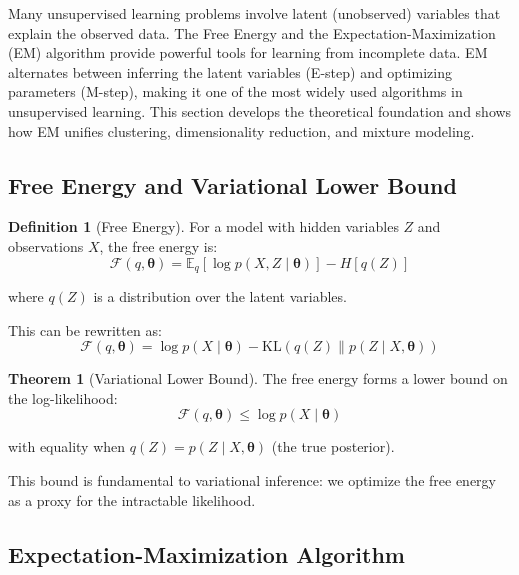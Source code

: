 \documentclass[12pt,a4paper]{article}
\theoremstyle{definition}
\newtheorem{definition}{Definition}[section]
\newtheorem{theorem}{Theorem}[section]
\begin{document}
Many unsupervised learning problems involve latent (unobserved) variables that explain the observed data. The Free Energy and the Expectation-Maximization (EM) algorithm provide powerful tools for learning from incomplete data. EM alternates between inferring the latent variables (E-step) and optimizing parameters (M-step), making it one of the most widely used algorithms in unsupervised learning. This section develops the theoretical foundation and shows how EM unifies clustering, dimensionality reduction, and mixture modeling.

\subsection{Free Energy and Variational Lower Bound}

\begin{definition}[Free Energy]
For a model with hidden variables $Z$ and observations $X$, the free energy is:
\[
\mathcal{F}(q, \boldsymbol{\theta}) = \mathbb{E}_q[\log p(X, Z \mid \boldsymbol{\theta})] - H[q(Z)]
\]

where $q(Z)$ is a distribution over the latent variables.

This can be rewritten as:
\[
\mathcal{F}(q, \boldsymbol{\theta}) = \log p(X \mid \boldsymbol{\theta}) - \text{KL}(q(Z) \| p(Z \mid X, \boldsymbol{\theta}))
\]
\end{definition}

\begin{theorem}[Variational Lower Bound]
The free energy forms a lower bound on the log-likelihood:
\[
\mathcal{F}(q, \boldsymbol{\theta}) \leq \log p(X \mid \boldsymbol{\theta})
\]

with equality when $q(Z) = p(Z \mid X, \boldsymbol{\theta})$ (the true posterior).
\end{theorem}

This bound is fundamental to variational inference: we optimize the free energy as a proxy for the intractable likelihood.

\subsection{Expectation-Maximization Algorithm}
\end{document}
